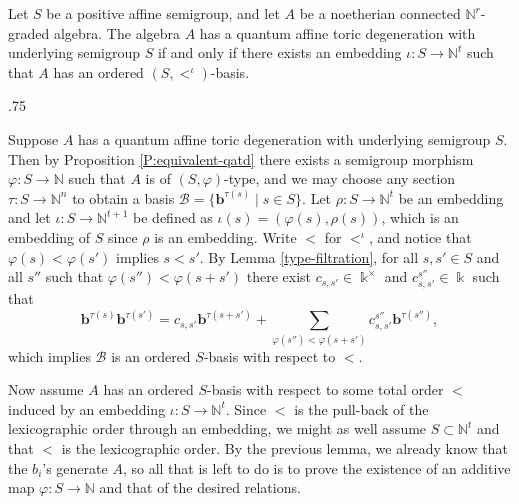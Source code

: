 \documentclass[11pt,fleqn]{article}
\makeatletter
\renewenvironment{proof}[1][\textit{Proof}]{\par
  \pushQED{\qed}%
  \normalfont \topsep.75\paraskip\relax
  \trivlist
  \item[\hskip\labelsep
        \itshape
    #1\@addpunct{.}]\ignorespaces
}{%
  \popQED\endtrivlist\@endpefalse
}
\newcommand\NN{\mathbb N}
\renewcommand\to{\longrightarrow}
\renewcommand\phi{\varphi}
\renewcommand\b{\mathbf b}
\renewcommand\k{\Bbbk}
\makeatother
\begin{document}
\begin{Proposition}
\label{S-ordered-basis-degeneration}
Let $S$ be a positive affine semigroup, and let $A$ be a noetherian connected 
$\NN^r$-graded algebra. The algebra $A$ has a quantum affine toric 
degeneration with underlying semigroup $S$ if and only if there exists an 
embedding $\iota: S \to \NN^t$ such that $A$ has an ordered 
$(S, <^\iota)$-basis.
\end{Proposition}
\begin{proof}
Suppose $A$ has a quantum affine toric degeneration with underlying semigroup 
$S$. Then by Proposition \ref{P:equivalent-qatd} there exists a semigroup 
morphism $\phi: S\to \NN$ such that $A$ is of $(S, \phi)$-type, and we may 
choose any section $\tau: S \to \NN^n$ to obtain a basis $\mathcal B = 
\{\b^{\tau(s)} \mid s \in S\}$. Let $\rho: S \to \NN^{t}$ be an embedding and 
let $\iota: S \to \NN^{t+1}$ be defined as $\iota(s) = (\phi(s), \rho(s))$, 
which is an embedding of $S$ since $\rho$ is an embedding. Write $<$ for 
$<^\iota$, and notice that $\phi(s) < \phi(s')$ implies $s<s'$. By Lemma 
\ref{type-filtration}, for all $s,s' \in S$ and all $s''$ such that 
$\phi(s'') < \phi(s+s')$ there exist $c_{s,s'} \in \k^\times$ and 
$c_{s,s'}^{s''} \in \k$ such that
\[
  \b^{\tau(s)}\b^{\tau(s')} 
    = c_{s,s'}\b^{\tau(s+s')} 
      + \sum_{\phi(s'') < \phi(s+s')} c_{s,s'}^{s''} \b^{\tau(s'')},
\]
which implies $\mathcal B$ is an ordered $S$-basis with respect to $<$.

Now assume $A$ has an ordered $S$-basis with respect to some total order $<$ 
induced by an embedding $\iota: S \to \NN^t$. Since $<$ is the pull-back of 
the lexicographic order through an embedding, we might as well assume $S 
\subset \NN^t$ and that $<$ is the lexicographic order. By the previous lemma, 
we already know that the $b_i$'s generate $A$, so all that is left to do is to 
prove the existence of an additive map $\phi:S \to \NN$ and that of the 
desired relations.


\end{proof}
\end{document}

